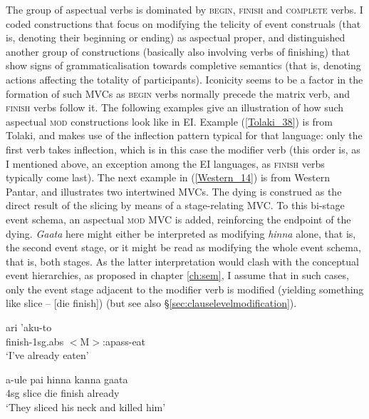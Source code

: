 The group of aspectual verbs is dominated by \textsc{begin}, \textsc{finish} and \textsc{complete} verbs. I coded constructions that focus on modifying the telicity of event construals (that is, denoting their beginning or ending) as aspectual proper, and distinguished another group of constructions (basically also involving verbs of finishing) that show signs of grammaticalisation towards completive semantics (that is, denoting actions affecting the totality of participants). Iconicity seems to be a factor in the formation of such MVCs as \textsc{begin} verbs normally precede the matrix verb, and \textsc{finish} verbs follow it. The following examples give an illustration of how such aspectual \textsc{mod} constructions look like in EI. Example (\ref{Tolaki_38}) is from Tolaki, and makes use of the inflection pattern typical for that language: only the first verb takes inflection, which is in this case the modifier verb (this order is, as I mentioned above, an exception among the EI  languages, as \textsc{finish} verbs typically come last). The next example in (\ref{Western_14}) is from Western Pantar, and illustrates two intertwined MVCs. The dying is construed as the direct result of the slicing by means of a stage-relating MVC. To this bi-stage event schema, an aspectual \textsc{mod} MVC is added, reinforcing the endpoint of the dying. \textit{Gaata} here might either be interpreted as modifying \textit{hinna} alone, that is, the second event stage, or it might be read as modifying the whole event schema, that is, both stages. As the latter interpretation would clash with the conceptual event hierarchies, as proposed in chapter \ref{ch:sem}, I assume that in such cases, only the event stage adjacent to the modifier verb is modified (yielding something like slice -- [die finish]) (but see also §\ref{sec:clauselevelmodification}).

\ea \label{Tolaki_38}
\gll ari 'aku-to \\
finish-1\acs{sg}.\acs{abs} $<$M$>$:\acs{apass}-eat \\
\glft `I've already eaten' \\ 
\z
\xe

\ea \label{Western_14}
\gll a-ule pai hinna kanna gaata \\
4\acs{sg} slice die finish already \\
\glft `They sliced his neck and killed him' \\ 
\z
\xe


